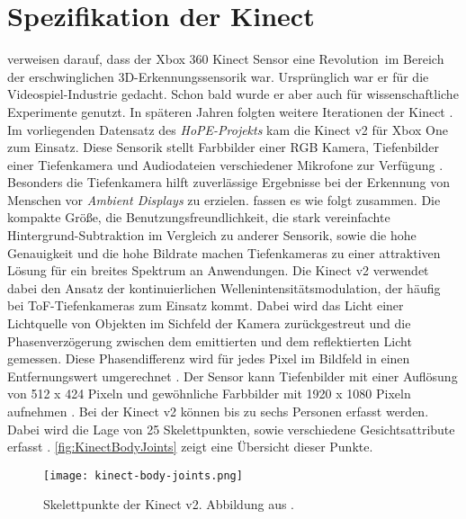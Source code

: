 \section{Spezifikation der Kinect}
\label{2-SpezifikationKinect}
\citep{tolgyessy_evaluation_2021} verweisen darauf,
dass der Xbox 360 Kinect Sensor eine \glqq Revolution\grqq\ im Bereich der erschwinglichen 3D-Erkennungssensorik war.
Ursprünglich war er für die Videospiel-Industrie gedacht.
Schon bald wurde er aber auch für wissenschaftliche Experimente genutzt.
In späteren Jahren folgten weitere Iterationen der Kinect \citep{tolgyessy_evaluation_2021}.
Im vorliegenden Datensatz des \emph{HoPE-Projekts} kam die Kinect v2 für Xbox One zum Einsatz.
Diese Sensorik stellt Farbbilder einer \ac{RGB} Kamera, Tiefenbilder einer Tiefenkamera
und Audiodateien verschiedener Mikrofone zur Verfügung \citep{windows-developer-center_microsoft_corporation_human_2014}.
Besonders die Tiefenkamera hilft zuverlässige Ergebnisse bei der Erkennung von Menschen vor \emph{Ambient Displays} zu erzielen.
\citet{li_time-flight_2014} fassen es wie folgt zusammen.
Die kompakte Größe, die Benutzungsfreundlichkeit,
die stark vereinfachte Hintergrund-Subtraktion im Vergleich zu anderer Sensorik, sowie die hohe Genauigkeit
und die hohe Bildrate machen Tiefenkameras zu einer attraktiven Lösung für ein breites Spektrum an Anwendungen.
Die Kinect v2 verwendet dabei den Ansatz der kontinuierlichen Wellenintensitätsmodulation,
der häufig bei \ac{ToF}-Tiefenkameras zum Einsatz kommt.
Dabei wird das Licht einer Lichtquelle von Objekten im Sichfeld der Kamera zurückgestreut
und die Phasenverzögerung zwischen dem emittierten und dem reflektierten Licht gemessen.
Diese Phasendifferenz wird für jedes Pixel im Bildfeld in einen Entfernungswert umgerechnet \citep{tolgyessy_evaluation_2021}.
Der Sensor kann Tiefenbilder mit einer Auflösung von 512 x 424 Pixeln
und gewöhnliche Farbbilder mit 1920 x 1080 Pixeln aufnehmen \citep{marin_multi-camera_2019}.
Bei der Kinect v2 können bis zu sechs Personen erfasst werden.
Dabei wird die Lage von 25 Skelettpunkten, sowie verschiedene Gesichtsattribute erfasst \citep{windows-developer-center_microsoft_corporation_human_2014}.
\autoref{fig:KinectBodyJoints} zeigt eine Übersicht dieser Punkte. 

\begin{figure}[ht]
  \begin{center}
  \texttt{[image: kinect-body-joints.png]}
  \end{center}
  \caption{Skelettpunkte der Kinect v2. Abbildung aus \citet{windows-developer-center_microsoft_corporation_human_2014}.}
  \label{fig:KinectBodyJoints}
\end{figure}


